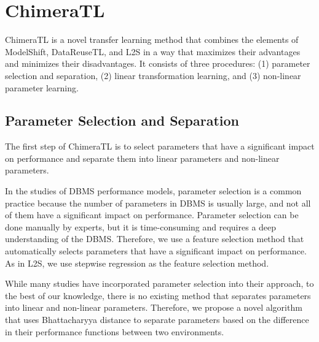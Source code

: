 \section{ChimeraTL}
ChimeraTL is a novel transfer learning method that combines the elements of ModelShift, DataReuseTL, and L2S in a way that maximizes their advantages and minimizes their disadvantages.
It consists of three procedures: (1) parameter selection and separation, (2) linear transformation learning, and (3) non-linear parameter learning.

\subsection{Parameter Selection and Separation}
\label{sec:parameter_selection}
The first step of ChimeraTL is to select parameters that have a significant impact on performance and separate them into linear parameters and non-linear parameters.

In the studies of DBMS performance models, parameter selection is a common practice because the number of parameters in DBMS is usually large, and not all of them have a significant impact on performance\cite{mysql197,Ottertune}.
Parameter selection can be done manually by experts, but it is time-consuming and requires a deep understanding of the DBMS.
Therefore, we use a feature selection method that automatically selects parameters that have a significant impact on performance.
As in L2S\cite{l2s}, we use stepwise regression\cite{stepwise} as the feature selection method.

While many studies have incorporated parameter selection into their approach, to the best of our knowledge, there is no existing method that separates parameters into linear and non-linear parameters.
Therefore, we propose a novel algorithm that uses Bhattacharyya distance\cite{bhattacharyya} to separate parameters based on the difference in their performance functions between two environments.

